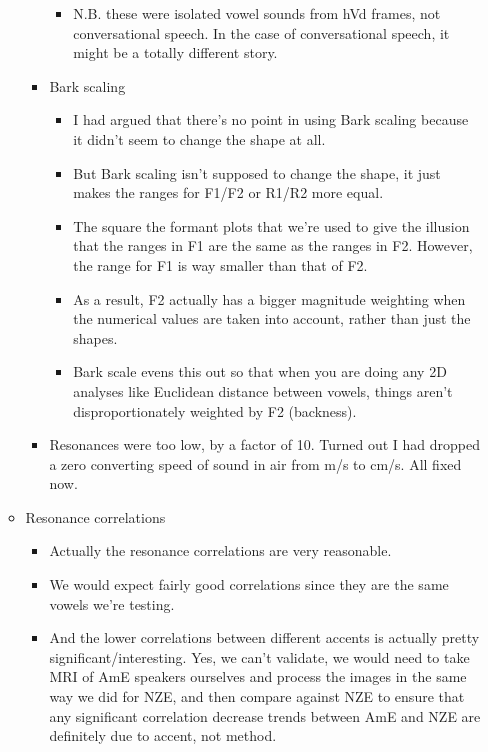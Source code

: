 \documentclass{article}
\begin{document}
\begin{itemize}
\begin{itemize}
\begin{itemize}
\begin{itemize}
                \item N.B. these were isolated vowel sounds from hVd frames, not conversational speech. In the case of conversational speech, it might be a totally different story.
            \end{itemize}
            \item Bark scaling
            \begin{itemize}
                \item I had argued that there's no point in using Bark scaling because it didn't seem to change the shape at all.
                \item But Bark scaling isn't supposed to change the shape, it just makes the ranges for F1/F2 or R1/R2 more equal.
                \item The square the formant plots that we're used to give the illusion that the ranges in F1 are the same as the ranges in F2. However, the range for F1 is way smaller than that of F2.
                \item As a result, F2 actually has a bigger magnitude weighting when the numerical values are taken into account, rather than just the shapes.
                \item Bark scale evens this out so that when you are doing any 2D analyses like Euclidean distance between vowels, things aren't disproportionately weighted by F2 (backness). 
            \end{itemize}
            \item Resonances were too low, by a factor of 10. Turned out I had dropped a zero converting speed of sound in air from m/s to cm/s. All fixed now.
        \end{itemize}
        \item Resonance correlations
        \begin{itemize}
            \item Actually the resonance correlations are very reasonable.
            \item We would expect fairly good correlations since they are the same vowels we're testing.
            \item And the lower correlations between different accents is actually pretty significant/interesting. Yes, we can't validate, we would need to take MRI of AmE speakers ourselves and process the images in the same way we did for NZE, and then compare against NZE to ensure that any significant correlation decrease trends between AmE and NZE are definitely due to accent, not method.

\end{itemize}
\end{itemize}
\end{itemize}
\end{document}
